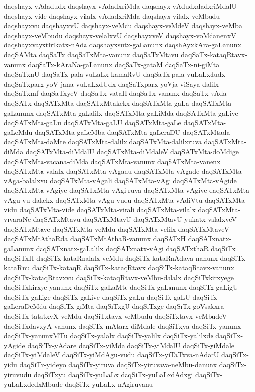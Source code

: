 {daqshayx-vAdadudx
daqshayx-vAdadxriMda
daqshayx-vAdudxdadxriMdalU
daqshayx-vide
daqshayx-vilalx-vAdadxriMda
daqshayx-vilalx-veMbudu
daqshayxvu
daqshayxvU
daqshayx-veMdu
daqshayx-veMdeV
daqshayx-veMba
daqshayx-veMbudu
daqshayx-velalxvU
daqshayxveV
daqshayx-voMdanenxV
daqshayxvayxtirikatx-nAda
daqshayxsutx-gaLanunx
daqshAyxkAra-gaLanunx
daqSAMta
daqSaTx
daqSaTxMta-vanunx
daqSaTxMtavu
daqSaTx-kataqRtavx-vanunx
daqSaTx-kAraNa-gaLanunx
daqSaTx-gataM
daqSaTx-ni-giMta
daqSaTxnU
daqSaTx-pala-vuLaLx-kamaRvU
daqSaTx-pala-vuLaLxdudx
daqSaTxparx-yoV-jana-vuLaLxdUdx
daqSaTxparx-yoVja-viSaya-dalilx
daqSaTxmf
daqSaTxyeV
daqSaTx-vataH
daqSaTx-vanunx
daqSaTx-vAda
daqSATx
daqSATxMta
daqSATxMtakekx
daqSATxMta-gaLa
daqSATxMta-gaLanunx
daqSATxMta-gaLalilx
daqSATxMta-gaLiMda
daqSATxMta-gaLive
daqSATxMta-gaLu
daqSATxMta-gaLU
daqSATxMta-gaLe
daqSATxMta-gaLeMdu
daqSATxMta-gaLeMba
daqSATxMta-gaLeraDU
daqSATxMtada
daqSATxMta-daMte
daqSATxMta-dalilx
daqSATxMta-dalilxruva
daqSATxMta-diMda
daqSATxMta-diMdalU
daqSATxMta-diMdaleV
daqSATxMta-doMdige
daqSATxMta-vacana-diMda
daqSATxMta-vanunx
daqSATxMta-vanenx
daqSATxMta-valalx
daqSATxMta-vAgadu
daqSATxMta-vAgade
daqSATxMta-vAga-balalxvu
daqSATxMta-vAgali
daqSATxMta-vAgi
daqSATxMta-vAgide
daqSATxMta-vAgiye
daqSATxMta-vAgi-ruva
daqSATxMta-vAgive
daqSATxMta-vAgu-vu-dakekx
daqSATxMta-vAgu-vudu
daqSATxMta-vAdiVtu
daqSATxMta-vidu
daqSATxMta-vide
daqSATxMta-virali
daqSATxMta-vilalx
daqSATxMta-vivaraNe
daqSATxMtavu
daqSATxMtavU
daqSATxMtavU-yukatx-valalxveV
daqSATxMtave
daqSATxMta-veMdu
daqSATxMta-velilx
daqSATxMtaveV
daqSATxMtAthaRda
daqSATxMtAthaR-vanunx
daqSATxH
daqSATxnatx-gaLanunx
daqSATxnatx-gaLalilx
daqSATxnatx-vAgi
daqSATxthaR
daqSiTx
daqSiTxH
daqSiTx-kataRnalalx-veMdu
daqSiTx-kataRnAdava-nanunx
daqSiTx-kataRnu
daqSiTx-kataqR
daqSiTx-kataqRtavx
daqSiTx-kataqRtavx-vanunx
daqSiTx-kataqRtavxvu
daqSiTx-kataqRtavx-veMbu-dalalx
daqSiTxkirxyege
daqSiTxkirxye-yanunx
daqSiTx-gaLaMte
daqSiTx-gaLanunx
daqSiTx-gaLigU
daqSiTx-gaLige
daqSiTx-gaLive
daqSiTx-gaLu
daqSiTx-gaLU
daqSiTx-gaLeraDeMdu
daqSiTx-giMta
daqSiTxgU
daqSiTxge
daqSiTx-goVsakxra
daqSiTx-tatatxvX-veMdu
daqSiTxtavx-veMbudu
daqSiTxtavx-veMbudeV
daqSiTxdavxyA-vanunx
daqSiTx-mAtarx-diMdale
daqSiTxya
daqSiTx-yanunx
daqSiTx-yanunxMTu
daqSiTx-yalalx
daqSiTx-yalilx
daqSiTx-yalilxde
daqSiTx-yAgide
daqSiTx-yAdare
daqSiTx-yiMda
daqSiTx-yiMdalU
daqSiTx-yiMdale
daqSiTx-yiMdaleV
daqSiTx-yiMdAgu-vudu
daqSiTx-yiTaTxva-nAdarU
daqSiTx-yidu
daqSiTx-yideyo
daqSiTx-yiruva
daqSiTx-yiruvava-neMbu-danunx
daqSiTx-yiruvudu
daqSiTxyu
daqSiTx-yuLaLx
daqSiTx-yuLaLxdAdxgi
daqSiTx-yuLaLxdedxMbude
daqSiTx-yuLaLx-nAgiruvanu
}
